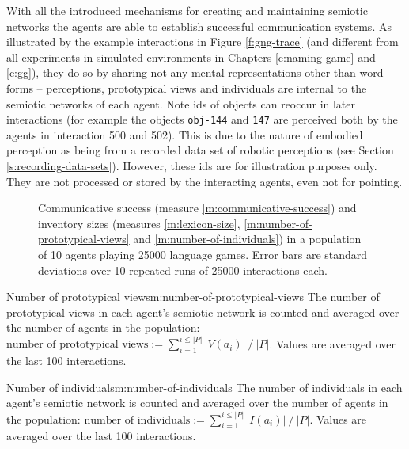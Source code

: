With all the introduced mechanisms for creating and maintaining
semiotic networks the agents are able to establish successful
communication systems. As illustrated by the example interactions in
Figure \ref{f:gng-trace} (and different from all experiments in
simulated environments in Chapters \ref{c:naming-game} and
\ref{c:gg}), they do so by sharing not any mental representations
other than word forms -- perceptions, prototypical views and
individuals are internal to the semiotic networks of each agent. Note
ids of objects can reoccur in later interactions (for example the
objects \texttt{obj-144} and \texttt{147} are perceived both by the
agents in interaction 500 and 502). This is due to the nature of
embodied perception as being from a recorded data set of robotic
perceptions (see Section \ref{s:recording-data-sets}). However, these
ids are for illustration purposes only. They are not processed or
stored by the interacting agents, even not for pointing.

\begin{figure}[t]
  \caption{Commun\-icative success (measure
    \ref{m:communicative-success}) and inventory sizes (measures
    \ref{m:lexicon-size}, \ref{m:number-of-prototypical-views} and
    \ref{m:number-of-individuals}) in a population of 10 agents
    playing 25000 language games. Error bars are standard deviations
    over 10 repeated runs of 25000 interactions each.  }
  \label{f:gng-results-no-heuristics}
\end{figure}

\begin{measure}[b]{Number of prototypical views}{m:number-of-prototypical-views}
  The number of prototypical views in each agent's semiotic network is
  counted and averaged over the number of agents in the population:
  $\text{number of prototypical views} :=
  \sum_{i=1}^{i\leq|P|}|V(a_i)|\ /\ |P|$. Values are averaged over the
  last 100 interactions.
\end{measure}

\begin{measure}[b]{Number of individuals}{m:number-of-individuals}
  The number of individuals in each agent's semiotic network is
  counted and averaged over the number of agents in the population:
  $\text{number of individuals} := \sum_{i=1}^{i\leq|P|}|I(a_i)|\ /\
  |P|$. Values are averaged over the last 100 interactions.
\end{measure}


